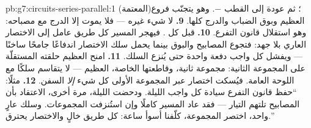 \begin{solution}{pb:g7:circuits-series-parallel:1}
(المعتمة)؛ ثم عودة إلى القطب $-$. وهو يتجنّب فروع 
العظيم وبوق الضباب والدرج كلها.
\textbf{9.} لا شيء غيره --- فلا يموت إلا  الدرج مع مصباحه:
وهو استقلال قانون التفرع.
\textbf{10.}  قبل كل . فيهجر المسير كل طريق عامل
إلى الاختصار العاري بلا جهد: فتجوع المصابيح والبوق بينما يحمل
سلك الاختصار اندفاعًا جامحًا ساخنًا --- ويفشل كل واجب دفعة
واحدة حتى يُنزع السلك.
\textbf{11.} امنح  العظيم حلقته المستقلّة على المجموعة
الثانية: مجموعة ثانية، وقاطعتها الخاصة،  العظيم ---
لا يتقاسم سلكًا مع اللوحة العامة. فيُسكت اختصار عبر المجموعة
الأولى كل شيء \emph{إلا}  السفن.
\textbf{12.} مثلًا: ``حفظ قانون التفرع سيادة كل واجب الليلة.
ودحضت الليلة، مرة أخرى، الاعتقاد بأن المصابيح تلتهم التيار ---
فقد عاد المسير كاملًا وإن استُنزفت المجموعات. وسلك عارٍ واحد،
اختصر المجموعة، كلّفنا أسوأ ساعة: كل طريق خالٍ والاختصار
يحترق.''
\end{solution}
